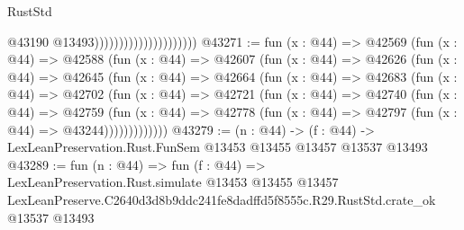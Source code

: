 \begin{lexlean}{RustStd}
\begin{coremodule}
                                              @43190
                                              @13493)))))))))))))))))))))
@43271 := fun (x : @44) =>
  @42569
    (fun (x : @44) =>
    @42588
      (fun (x : @44) =>
      @42607
        (fun (x : @44) =>
        @42626
          (fun (x : @44) =>
          @42645
            (fun (x : @44) =>
            @42664
              (fun (x : @44) =>
              @42683
                (fun (x : @44) =>
                @42702
                  (fun (x : @44) =>
                  @42721
                    (fun (x : @44) =>
                    @42740
                      (fun (x : @44) =>
                      @42759
                        (fun (x : @44) =>
                        @42778 (fun (x : @44) => @42797 (fun (x : @44) => @43244)))))))))))))
@43279 := (n : @44) ->
  (f : @44) -> LexLeanPreservation.Rust.FunSem @13453 @13455 @13457 @13537 @13493
@43289 := fun (n : @44) =>
  fun (f : @44) =>
  LexLeanPreservation.Rust.simulate
    @13453
    @13455
    @13457
    LexLeanPreserve.C2640d3d8b9ddc241fe8dadffd5f8555c.R29.RustStd.crate_ok
    @13537
    @13493
\end{coremodule}
\end{lexlean}
